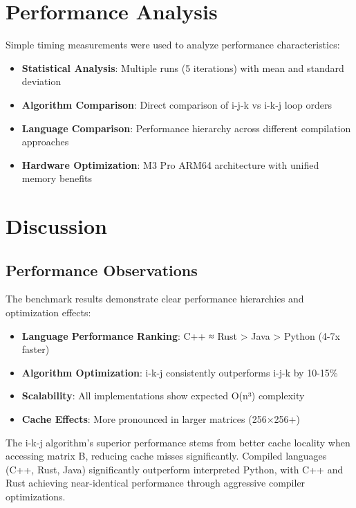 \documentclass[11pt,a4paper]{article}
\begin{document}

\section{Performance Analysis}

Simple timing measurements were used to analyze performance characteristics:

\begin{itemize}
    \item \textbf{Statistical Analysis}: Multiple runs (5 iterations) with mean and standard deviation
    \item \textbf{Algorithm Comparison}: Direct comparison of i-j-k vs i-k-j loop orders
    \item \textbf{Language Comparison}: Performance hierarchy across different compilation approaches
    \item \textbf{Hardware Optimization}: M3 Pro ARM64 architecture with unified memory benefits
\end{itemize}

\section{Discussion}

\subsection{Performance Observations}

The benchmark results demonstrate clear performance hierarchies and optimization effects:

\begin{itemize}
    \item \textbf{Language Performance Ranking}: C++ ≈ Rust > Java > Python (4-7x faster)
    \item \textbf{Algorithm Optimization}: i-k-j consistently outperforms i-j-k by 10-15\%
    \item \textbf{Scalability}: All implementations show expected O(n³) complexity
    \item \textbf{Cache Effects}: More pronounced in larger matrices (256×256+)
\end{itemize}

The i-k-j algorithm's superior performance stems from better cache locality when accessing matrix B, reducing cache misses significantly. Compiled languages (C++, Rust, Java) significantly outperform interpreted Python, with C++ and Rust achieving near-identical performance through aggressive compiler optimizations.
\end{document}
